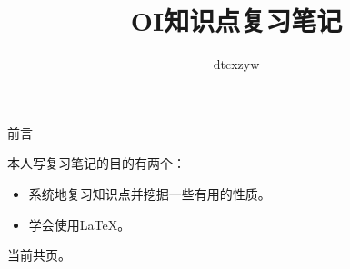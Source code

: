 \documentclass[10pt,a16paper,UTF8,AutoFakeBold]{book}
\begin{document}
\title{OI知识点复习笔记}
\author{dtcxzyw}
\maketitle
\frontmatter
\begin{center}
	\Huge 前言
\end{center}
本人写复习笔记的目的有两个：
\begin{itemize}
	\item 系统地复习知识点并挖掘一些有用的性质。
	\item 学会使用\LaTeX{}。
\end{itemize}
当前共\pageref{LastPage}页。
\tableofcontents
\mainmatter{}




\appendix

\printindex

\end{document}
